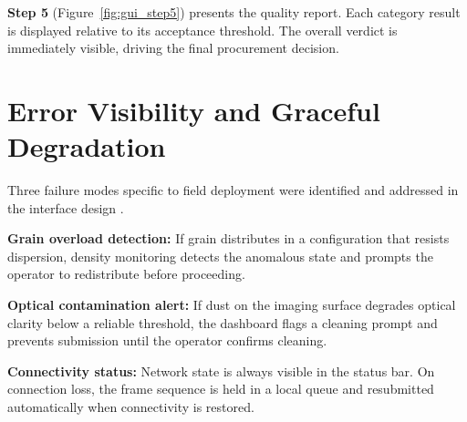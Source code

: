 \textbf{Step 5} (Figure~\ref{fig:gui_step5}) presents the quality report. Each category result is displayed relative to its acceptance threshold. The overall verdict is immediately visible, driving the final procurement decision.

\section{Error Visibility and Graceful Degradation}

Three failure modes specific to field deployment were identified and addressed in the interface design \cite{Shneiderman2016}.

\textbf{Grain overload detection:} If grain distributes in a configuration that resists dispersion, density monitoring detects the anomalous state and prompts the operator to redistribute before proceeding.

\textbf{Optical contamination alert:} If dust on the imaging surface degrades optical clarity below a reliable threshold, the dashboard flags a cleaning prompt and prevents submission until the operator confirms cleaning.

\textbf{Connectivity status:} Network state is always visible in the status bar. On connection loss, the frame sequence is held in a local queue and resubmitted automatically when connectivity is restored.
